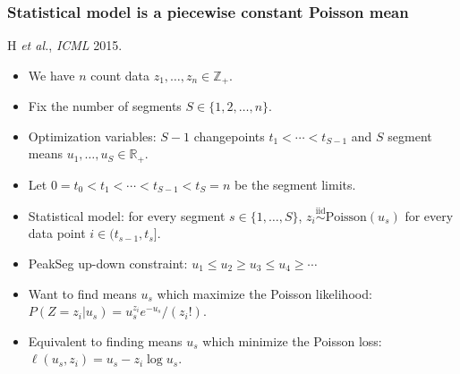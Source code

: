 \documentclass{beamer}
\newcommand{\RR}{\mathbb R}
\newcommand{\ZZ}{\mathbb Z}
\begin{document}
\begin{frame}
  \frametitle{Statistical model is a piecewise constant Poisson mean}
  H {\it et al.}, {\it ICML} 2015. 

  
  \vskip -0.8cm    
  \begin{itemize}
  \item We have $n$ count data $z_1, \dots, z_n\in\ZZ_+$.
  \item Fix the number of segments $S\in\{1, 2, \dots, n\}$.
  \item Optimization variables: $S-1$ changepoints
    $t_1 < \cdots < t_{S-1}$ and $S$ segment means $u_1,\dots,u_S\in\RR_+$.
  \item Let $0=t_0<t_1 < \cdots < t_{S-1}<t_S=n$ be the segment
    limits.
  \item Statistical model: for every segment $s\in\{1,\dots,S\}$,
    $z_i \stackrel{\text{iid}}{\sim} \text{Poisson}(u_s)$ for every data
    point $i\in(t_{s-1},t_s]$.
  \item PeakSeg up-down constraint: $u_1\leq u_2 \geq u_3 \leq u_4 \geq \cdots$
  \item Want to find means $u_s$ which maximize the Poisson likelihood:
    $P(Z = z_i|u_s) = u_s^{z_i} e^{-u_s} / (z_i!)$.
  \item Equivalent to finding means $u_s$ which minimize the Poisson
    loss: $\ell(u_s, z_i) = u_s - z_i\log u_s$.
  \end{itemize}
\end{frame}
\end{document}
